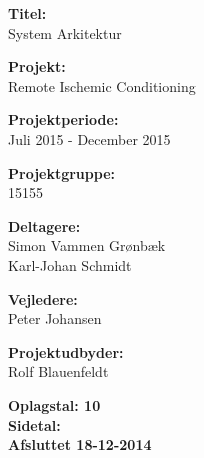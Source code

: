 \begin{minipage}[t]{0.48\textwidth}
\textbf{Titel:} \\[5pt]\bigskip\hspace{2ex}
System Arkitektur

\textbf{Projekt:} \\[5pt]\bigskip\hspace{2ex}
Remote Ischemic Conditioning

\textbf{Projektperiode:} \\[5pt]\bigskip\hspace{2ex}
Juli 2015 - December 2015

\textbf{Projektgruppe:} \\[5pt]\bigskip\hspace{2ex}
15155

\textbf{Deltagere:} \\[5pt]\hspace*{2ex}
Simon Vammen Grønbæk\\\hspace*{2ex}
Karl-Johan Schmidt \\\hspace*{2ex}


\textbf{Vejledere:} \\[5pt]\hspace*{2ex}
Peter Johansen \\\bigskip\hspace{2ex}

\textbf{Projektudbyder:} \\[5pt]\hspace*{2ex}
Rolf Blauenfeldt\\\bigskip\hspace{2ex}
\vspace*{4cm}

\textbf{Oplagstal: 10} \\
\textbf{Sidetal: \pageref{LastPage}} \\
\textbf{Afsluttet 18-12-2014}

\end{minipage}
\hfill

